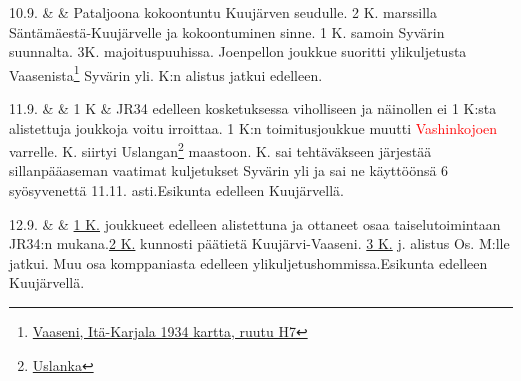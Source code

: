 \documentclass[11pt,a5paper,oneside]{book}
\begin{document}
\newpage

10.9. & & Pataljoona kokoontuntu Kuujärven seudulle. 2 K. marssilla Säntämäestä-Kuujärvelle ja kokoontuminen sinne. 1 K. samoin Syvärin suunnalta. 3K. majoituspuuhissa. Joenpellon joukkue suoritti ylikuljetusta Vaasenista\footnote{\href{https://www.google.fi/maps/place/Vaaseni,+Leningradin+alue,+Ven\%C3\%A4j\%C3\%A4,+187742/@60.9621216,34.0129134,15z/}{Vaaseni, Itä-Karjala 1934 kartta, ruutu H7}} Syvärin yli. K:n alistus jatkui edelleen.\\

\taulustop


11.9. & & 1 K \& JR34 edelleen kosketuksessa viholliseen ja näinollen ei 1 K:sta alistettuja joukkoja voitu irroittaa. 1 K:n toimitusjoukkue muutti \textcolor{red}{Vashinkojoen} varrelle.\newline{} K. siirtyi Uslangan\footnote{\href{https://www.google.fi/maps/place/6\%C2\%B058'32.7\%22N+33\%C2\%B054'02.8\%22E/@60.976793,33.8997559,17z/}{Uslanka}} maastoon.\newline{} K. sai tehtäväkseen järjestää sillanpääaseman vaatimat kuljetukset Syvärin yli ja sai ne käyttöönsä 6 syösyvenettä 11.11. asti.\newline\newline Esikunta edelleen Kuujärvellä. \\

\newpage

12.9. & & \underline{1 K.} joukkueet edelleen alistettuna ja ottaneet osaa taiselutoimintaan JR34:n mukana.\newline\newline \underline{2 K.} kunnosti päätietä Kuujärvi-Vaaseni. \newline\newline \underline{3 K.}  j. alistus Os. M:lle jatkui. Muu osa komppaniasta edelleen ylikuljetushommissa.\newline\newline Esikunta edelleen Kuujärvellä. \\

\taulustop

\end{document}
